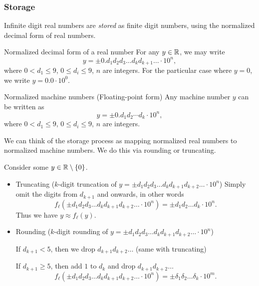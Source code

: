 \documentclass{article}
\begin{document}
  \subsubsection{Storage}
  Infinite digit real numbers are \emph{stored} as finite digit numbers, using the normalized decimal form of real numbers.
  \begin{definition}{Normalized decimal form of a real number}
    For any $y\in\mathbb{R}$, we may write
    \[
      y = \pm 0.d_1d_2d_3\dotsc d_kd_{k + 1}\dotsc\cdot 10^n,
    \]
    where $0 < d_1\leq 9$, $0\leq d_i\leq 9$, $n$ are integers. For the particular case where $y = 0$, we write $y = 0.0\cdot 10^0$.
  \end{definition}
  \begin{definition}{Normalized machine numbers (Floating-point form)}
    Any machine number $y$ can be written as
    \[
      y = \pm 0.d_1d_2\dotsb d_k\cdot 10^n,
    \]
    where $0 < d_1\leq 9$, $0\leq d_i\leq 9$, $n$ are integers.
  \end{definition}
  We can think of the storage process as mapping normalized real numbers to normalized machine numbers. We do this via rounding or truncating. \par
  Consider some $y\in\mathbb{R}\setminus \left\{0\right\}$.
  \begin{itemize}
    \item Truncating ($k$-digit truncation of $y = \pm d_1d_2d_3\dotsc d_kd_{k + 1}d_{k + 2}\dotsc\cdot 10^n$)
    Simply omit the digits from $d_{k + 1}$ and onwards, in other words
    \[
      f_\ell(\pm d_1d_2d_3\dotsc d_kd_{k + 1}d_{k + 2}\dotsc\cdot 10^n) = \pm d_1d_2\dotsc d_k\cdot 10^n.
    \]
    Thus we have $y\approx f_\ell(y)$.
    \item Rounding ($k$-digit rounding of $y = \pm d_1d_2d_3\dotsc d_kd_{k + 1}d_{k + 2}\dotsc\cdot 10^n$) \par
    If $d_{k + 1} < 5$, then we drop $d_{k + 1}d_{k + 2}\dotsc$ (same with truncating) \par
    If $d_{k + 1} \geq 5$, then add $1$ to $d_k$ and drop $d_{k + 1}d_{k + 2}\dotsc$
    \[
      f_\ell(\pm d_1d_2d_3\dotsc d_kd_{k + 1}d_{k + 2}\dotsc\cdot 10^n) = \pm \delta_1\delta_2\dotsc \delta_k\cdot 10^m.
    \]
  \end{itemize}
\end{document}
